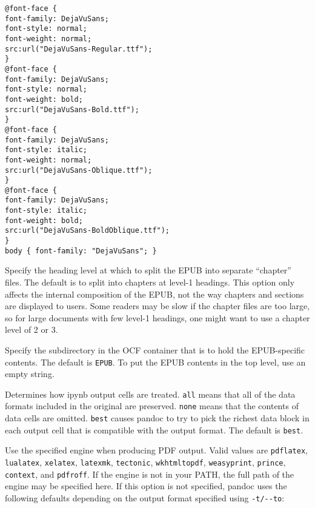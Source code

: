 \documentclass[]{article}
\begin{document}
\begin{description}
\begin{verbatim}
@font-face {
font-family: DejaVuSans;
font-style: normal;
font-weight: normal;
src:url("DejaVuSans-Regular.ttf");
}
@font-face {
font-family: DejaVuSans;
font-style: normal;
font-weight: bold;
src:url("DejaVuSans-Bold.ttf");
}
@font-face {
font-family: DejaVuSans;
font-style: italic;
font-weight: normal;
src:url("DejaVuSans-Oblique.ttf");
}
@font-face {
font-family: DejaVuSans;
font-style: italic;
font-weight: bold;
src:url("DejaVuSans-BoldOblique.ttf");
}
body { font-family: "DejaVuSans"; }
\end{verbatim}
\item[\texttt{-\/-epub-chapter-level=}\emph{NUMBER}]
Specify the heading level at which to split the EPUB into separate
``chapter'' files. The default is to split into chapters at level-1
headings. This option only affects the internal composition of the EPUB,
not the way chapters and sections are displayed to users. Some readers
may be slow if the chapter files are too large, so for large documents
with few level-1 headings, one might want to use a chapter level of 2 or
3.
\item[\texttt{-\/-epub-subdirectory=}\emph{DIRNAME}]
Specify the subdirectory in the OCF container that is to hold the
EPUB-specific contents. The default is \texttt{EPUB}. To put the EPUB
contents in the top level, use an empty string.
\item[\texttt{-\/-ipynb-output=all\textbar{}none\textbar{}best}]
Determines how ipynb output cells are treated. \texttt{all} means that
all of the data formats included in the original are preserved.
\texttt{none} means that the contents of data cells are omitted.
\texttt{best} causes pandoc to try to pick the richest data block in
each output cell that is compatible with the output format. The default
is \texttt{best}.
\item[\texttt{-\/-pdf-engine=}\emph{PROGRAM}]
Use the specified engine when producing PDF output. Valid values are
\texttt{pdflatex}, \texttt{lualatex}, \texttt{xelatex},
\texttt{latexmk}, \texttt{tectonic}, \texttt{wkhtmltopdf},
\texttt{weasyprint}, \texttt{prince}, \texttt{context}, and
\texttt{pdfroff}. If the engine is not in your PATH, the full path of
the engine may be specified here. If this option is not specified,
pandoc uses the following defaults depending on the output format
specified using \texttt{-t/-\/-to}:


\end{description}
\end{document}
